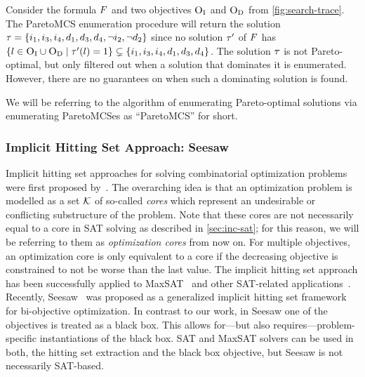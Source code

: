 \begin{example}\label{ex:MCS}
  Consider the formula $F$ and two objectives $\textsc{O}_{\text{I}}$ and $\textsc{O}_{\text{D}}$ from \cref{fig:search-trace}.
  The ParetoMCS enumeration procedure will return the solution $\tau = \{i_1,\allowbreak i_3,\allowbreak i_4,\allowbreak d_1,\allowbreak d_3,\allowbreak d_4,\allowbreak \lnot i_2,\allowbreak \lnot d_2\}$ since no solution $\tau'$ of $F$ has $\{l \in \textsc{O}_{\text{I}} \cup \textsc{O}_{\text{D}} \mid  \tau'(l) = 1\} \subsetneq \{i_1, i_3, i_4, d_1, d_3, d_4\}$.
  The solution $\tau$ is not Pareto-optimal, but only filtered out when a solution that dominates it is enumerated.
  However, there are no guarantees on when such a dominating solution is found. 
\end{example}

We will be referring to the algorithm of enumerating Pareto-optimal solutions via enumerating ParetoMCSes as ``ParetoMCS'' for short.

\subsubsection{Implicit Hitting Set Approach: Seesaw\label{sec:seesaw}}

Implicit hitting set approaches for solving combinatorial optimization problems were first proposed by~\textcite{DBLP:journals/ior/Moreno-CentenoK13}.
The overarching idea is that an optimization problem is modelled as a set $\mathcal{K}$ of so-called \emph{cores} which represent an undesirable or conflicting substructure of the problem.
Note that these cores are not necessarily equal to a core in SAT solving as described in \cref{sec:inc-sat};
for this reason, we will be referring to them as \emph{optimization cores} from now on.
For multiple objectives, an optimization core is only equivalent to a core if the decreasing objective is constrained to not be worse than the last value.
The implicit hitting set approach has been successfully applied to MaxSAT~\autocite{DBLP:conf/cp/DaviesB13,DBLP:conf/sat/DaviesB13,DBLP:conf/cp/DaviesB11,DBLP:conf/sat/BergBP20} and other SAT-related applications~\autocite{DBLP:conf/cp/DaviesB13,DBLP:conf/sat/DaviesB13,DBLP:conf/cp/DaviesB11,DBLP:conf/sat/BergBP20}.
Recently, Seesaw~\autocite{DBLP:conf/cp/JanotaMSM21} was proposed as a generalized implicit hitting set framework for bi-objective optimization.
In contrast to our work, in Seesaw one of the objectives is treated as a black box.
This allows for---but also requires---problem-specific instantiations of the black box.
SAT and MaxSAT solvers can be used in both, the hitting set extraction and the black box objective, but Seesaw is not necessarily SAT-based.

